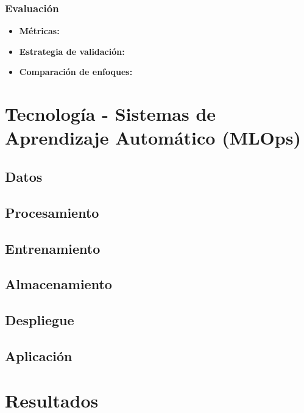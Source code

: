 \documentclass[11pt,a4paper]{article}
\begin{document}
\subsubsection{Evaluación}
\begin{itemize}
    \item \textbf{Métricas:}
    \item \textbf{Estrategia de validación:}
    \item \textbf{Comparación de enfoques:}
\end{itemize}

\section{Tecnología - Sistemas de Aprendizaje Automático (MLOps)}

\subsection{Datos}

\subsection{Procesamiento}

\subsection{Entrenamiento}

\subsection{Almacenamiento}

\subsection{Despliegue}

\subsection{Aplicación}

\section{Resultados}
\end{document}
